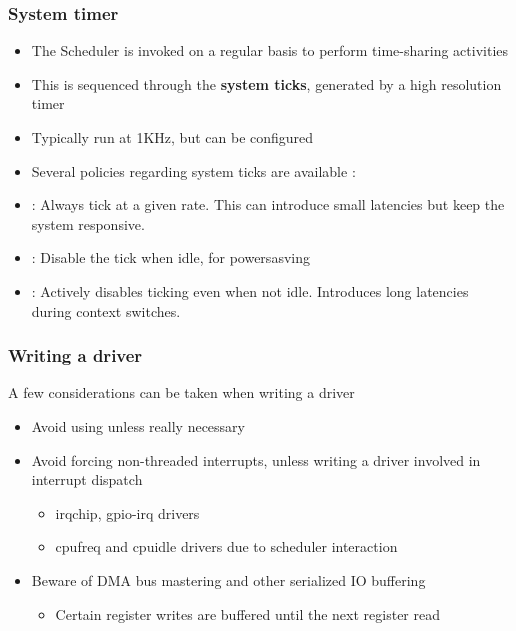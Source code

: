 \begin{frame}
	\frametitle{System timer}
	\begin{itemize}
		\item The Scheduler is invoked on a regular basis to perform time-sharing activities
		\item This is sequenced through the \textbf{system ticks}, generated by a high resolution timer
		\item Typically run at 1KHz, but can be configured
		\item Several policies regarding system ticks are available :
		\item {} : Always tick at a given rate. This can introduce small latencies but keep the system responsive.
		\item {} : Disable the tick when idle, for powersasving
		\item {} : Actively disables ticking even when not idle. Introduces long latencies during context switches.
	\end{itemize}
\end{frame}


\begin{frame}
		\frametitle{Writing a driver}
A few considerations can be taken when writing a driver
		\begin{itemize}
			\item Avoid using  unless really necessary
			\item Avoid forcing non-threaded interrupts, unless writing a driver involved in interrupt dispatch
				\begin{itemize}
					\item irqchip, gpio-irq drivers
					\item cpufreq and cpuidle drivers due to scheduler interaction
				\end{itemize}
			\item Beware of DMA bus mastering and other serialized IO buffering
				\begin{itemize}
					\item Certain register writes are buffered until the next register read
				\end{itemize}
		\end{itemize}
\end{frame}
